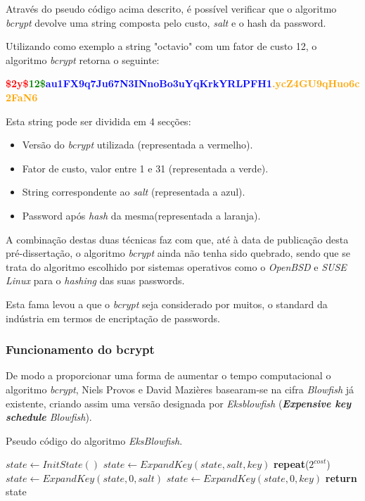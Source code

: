 Através do pseudo código acima descrito, é possível verificar que o algoritmo \emph{bcrypt} devolve uma string composta pelo custo, \emph{salt} e o hash da password.

Utilizando como exemplo a string "octavio" com um fator de custo 12, o algoritmo \emph{bcrypt} retorna o seguinte:

\begin{center}
    \textbf{\textcolor{red}{\$2y\$}\textcolor{green}{12\$}\textcolor{blue}{au1FX9q7Ju67N3INnoBo3uYqKrkYRLPFH1}\textcolor{orange}{.ycZ4GU9qHuo6c2FaN6}}
\end{center} 

Esta string pode ser dividida em 4 secções:

\begin{itemize}
    \item Versão do \emph{bcrypt} utilizada (representada a vermelho).
    \item Fator de custo, valor entre 1 e 31 (representada a verde).
    \item String correspondente ao \emph{salt} (representada a azul).
    \item Password após \emph{hash} da mesma(representada a laranja).
\end{itemize}

A combinação destas duas técnicas faz com que, até à data de publicação desta pré-dissertação, o algoritmo \emph{bcrypt} ainda não tenha sido quebrado, sendo que se trata do algoritmo escolhido por sistemas operativos como o \emph{OpenBSD} e \emph{SUSE Linux} para o \emph{hashing} das suas passwords.

Esta fama levou a que o \emph{bcrypt} seja considerado por muitos, o standard da indústria em termos de encriptação de passwords.

\subsubsection{Funcionamento do bcrypt}

De modo a proporcionar uma forma de aumentar o tempo computacional o algoritmo \emph{bcrypt}, Niels Provos e David Mazières basearam-se na cifra \emph{Blowfish} já existente, criando assim uma versão designada por \emph{Eksblowfish} (\textit{\textbf{Expensive key schedule} Blowfish}).

\begin{algorithm}
    \caption{Pseudo código do algoritmo \emph{EksBlowfish}.}
    \begin{algorithmic}[1]
        \State $state\gets InitState()$
        \State $state\gets ExpandKey(state, salt, key)$
        \State \textbf{repeat}($2^{cost}$)
        \State \indent $state\gets ExpandKey(state, 0, salt)$
        \State \indent $state\gets ExpandKey(state, 0, key)$
        \State \textbf{return} state
    \EndFunction
    \end{algorithmic}
\end{algorithm}

